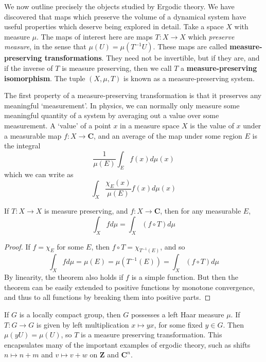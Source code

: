 We now outline precisely the objects studied by Ergodic theory. We have discovered that maps which preserve the volume of a dynamical system have useful properties which deserve being explored in detail. Take a space $X$ with measure $\mu$. The maps of interest here are maps $T: X \to X$ which {\it preserve measure}, in the sense that $\mu(U) = \mu(T^{-1}U)$. These maps are called {\bf measure-preserving transformations}. They need not be invertible, but if they are, and if the inverse of $T$ is measure preserving, then we call $T$ a {\bf measure-preserving isomorphism}. The tuple $(X,\mu,T)$ is known as a measure-preserving system.

The first property of a measure-preserving transformation is that it preserves any meaningful `measurement'. In physics, we can normally only measure some meaningful quantity of a system by averaging out a value over some measurement. A `value' of a point $x$ in a measure space $X$ is the value of $x$ under a measurable map $f: X \to \mathbf{C}$, and an average of the map under some region $E$ is the integral
%
\[ \frac{1}{\mu(E)} \int_E f(x) d\mu(x) \]
%
which we can write as
%
\[ \int_X \frac{\chi_E(x)}{\mu(E)} f(x) d\mu(x) \]

\begin{theorem}
    If $T: X \to X$ is measure preserving, and $f: X \to \mathbf{C}$, then for any measurable $E$,
    \[ \int_X f d \mu = \int_X (f \circ T) d\mu \]
\end{theorem}
\begin{proof}
    If $f = \chi_E$ for some $E$, then $f \circ T = \chi_{T^{-1}(E)}$, and so
    \[ \int_X f d \mu = \mu(E) = \mu(T^{-1}(E)) = \int_X (f \circ T) d\mu \]
    By linearity, the theorem also holds if $f$ is a simple function. But then the theorem can be easily extended to positive functions by monotone convergence, and thus to all functions by breaking them into positive parts.
\end{proof}

\begin{example}
    If $G$ is a locally compact group, then $G$ possesses a left Haar measure $\mu$. If $T: G \to G$ is given by left multiplication $x \mapsto yx$, for some fixed $y \in G$. Then $\mu(yU) = \mu(U)$, so $T$ is a measure preserving transformation. This encapsulates many of the important examples of ergodic theory, such as shifts $n \mapsto n + m$ and $v \mapsto v + w$ on $\mathbf{Z}$ and $\mathbf{C}^n$.
\end{example}

